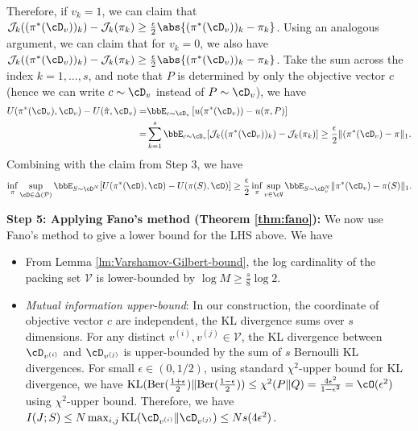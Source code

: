     Therefore, if $v_k = 1$, we can claim that $\mathcal J_k((\pi^*(\cD_v))_k) - \mathcal J_k(\pi_k) \geq \frac{\epsilon}{2}\abs{(\pi^*(\cD_v))_k - \pi_k}$. Using an analogous argument, we can claim that for $v_k = 0$, we also have $\mathcal J_k((\pi^*(\cD_v))_k) - \mathcal J_k(\pi_k) \geq \frac{\epsilon}{2}\abs{(\pi^*(\cD_v))_k - \pi_k}$. Take the sum across the index $k = 1, \dots, s$, and note that $P$ is determined by only the objective vector $c$ (hence we can write $c \sim \cD_v$ instead of $P \sim \cD_v$), we have
    \begin{equation*}
        \begin{aligned}
        U(\pi^*(\cD_v), \cD_v) - U(\hat{\pi}, \cD_v)
            = &\bbE_{c \sim \cD_v}\left[u(\pi^*(\cD_v)) - u(\pi, P)\right] \\
            = &\sum_{k = 1}^s \bbE_{c \sim \cD_v} [\mathcal J_k((\pi^*(\cD_v))_k) - \mathcal J_k(\pi_k)] \ge \frac{\epsilon}{2}\|(\pi^*(\cD_v) - \pi\|_1.
        \end{aligned}
    \end{equation*}
    Combining with the claim from Step 3, we have
    \begin{equation*}
        \begin{aligned}
            \inf_{\pi}\sup_{\cD \in \Delta(\mathcal{P})} \bbE_{S \sim \cD^N}[U(\pi^*(\cD), \cD) - U(\pi(S), \cD)]
            \geq \frac{\epsilon}{2}\inf_{\pi} \sup_{v \in \cV} \bbE_{S \sim \cD_v^N}\|\pi^*(\cD_v) - \pi(S)\|_1.
        \end{aligned}
    \end{equation*}
    
    \textbf{Step 5: Applying Fano's method (Theorem \ref{thm:fano}):} We now use Fano's method to give a lower bound for the LHS above. We have 
    \begin{itemize}
        \item From Lemma \ref{lm:Varshamov-Gilbert-bound}, the log cardinality of the packing set $\mathcal V$ is lower-bounded by $\log M \geq \frac{s}{8}\log 2$.
        \item \textit{Mutual information upper-bound}: In our construction, the coordinate of objective vector $c$ are independent, the KL divergence sums over $s$ dimensions. For any distinct $v^{(i)}, v^{(j)} \in \mathcal V$, the KL divergence between $\cD_{v^{(i)}}$ and $\cD_{v^{(j)}}$ is upper-bounded by the sum of $s$ Bernoulli KL divergences. {For small $\epsilon \in (0, 1/2)$, using standard $\chi^2$-upper bound for KL divergence, we have $\textup{KL}(\textup{Ber}(\frac{1 + \epsilon}{2}) \| \textup{Ber}(\frac{1 - \epsilon}{2})) \leq \chi^2(P \| Q) =  \frac{4\epsilon^2}{1 - \epsilon^2} = \cO(\epsilon^2)$ using $\chi^2$-upper bound.} Therefore, we have $I(J; S) \leq N \max_{i, j} \textup{KL}(\cD_{v^{(i)}} \| \cD_{v^{(j)}}) \leq  N s (4\epsilon^2)$.
    \end{itemize}
    
